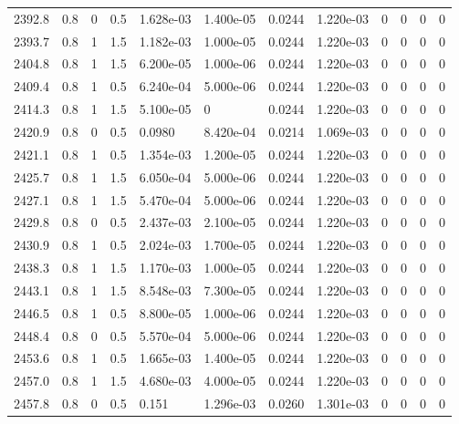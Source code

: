 \documentclass[preview]{standalone}
\begin{document}
{{{{{{{{{{{{{{\begin{tabular}{L{1.2cm}C{1.2cm} C{0.3cm}C{0.5cm} C{1.4cm}C{1.4cm} C{1.4cm}C{1.4cm} C{1.6cm}C{1.6cm} C{1.6cm}C{1.6cm}}
  2392.8  &   0.8  & 0     & 0.5 &  1.628e-03  & 1.400e-05  &  0.0244&   1.220e-03& 0 & 0   &  0 & 0  \\ 
  2393.7  &   0.8  & 1     & 1.5 &  1.182e-03  & 1.000e-05  &  0.0244&   1.220e-03& 0 & 0   &  0 & 0  \\ 
  2404.8  &   0.8  & 1     & 1.5 &  6.200e-05  & 1.000e-06  &  0.0244&   1.220e-03& 0 & 0   &  0 & 0  \\ 
  2409.4  &   0.8  & 1     & 0.5 &  6.240e-04  & 5.000e-06  &  0.0244&   1.220e-03& 0 & 0   &  0 & 0  \\ 
  2414.3  &   0.8  & 1     & 1.5 &  5.100e-05  & 0  &  0.0244&   1.220e-03& 0 & 0   &  0 & 0  \\ 
  2420.9  &   0.8  & 0     & 0.5 &  0.0980  & 8.420e-04  &  0.0214&   1.069e-03& 0 & 0   &  0 & 0  \\ 
  2421.1  &   0.8  & 1     & 0.5 &  1.354e-03  & 1.200e-05  &  0.0244&   1.220e-03& 0 & 0   &  0 & 0  \\ 
  2425.7  &   0.8  & 1     & 1.5 &  6.050e-04  & 5.000e-06  &  0.0244&   1.220e-03& 0 & 0   &  0 & 0  \\ 
  2427.1  &   0.8  & 1     & 1.5 &  5.470e-04  & 5.000e-06  &  0.0244&   1.220e-03& 0 & 0   &  0 & 0  \\ 
  2429.8  &   0.8  & 0     & 0.5 &  2.437e-03  & 2.100e-05  &  0.0244&   1.220e-03& 0 & 0   &  0 & 0  \\ 
  2430.9  &   0.8  & 1     & 0.5 &  2.024e-03  & 1.700e-05  &  0.0244&   1.220e-03& 0 & 0   &  0 & 0  \\ 
  2438.3  &   0.8  & 1     & 1.5 &  1.170e-03  & 1.000e-05  &  0.0244&   1.220e-03& 0 & 0   &  0 & 0  \\ 
  2443.1  &   0.8  & 1     & 1.5 &  8.548e-03  & 7.300e-05  &  0.0244&   1.220e-03& 0 & 0   &  0 & 0  \\ 
  2446.5  &   0.8  & 1     & 0.5 &  8.800e-05  & 1.000e-06  &  0.0244&   1.220e-03& 0 & 0   &  0 & 0  \\ 
  2448.4  &   0.8  & 0     & 0.5 &  5.570e-04  & 5.000e-06  &  0.0244&   1.220e-03& 0 & 0   &  0 & 0  \\ 
  2453.6  &   0.8  & 1     & 0.5 &  1.665e-03  & 1.400e-05  &  0.0244&   1.220e-03& 0 & 0   &  0 & 0  \\ 
  2457.0  &   0.8  & 1     & 1.5 &  4.680e-03  & 4.000e-05  &  0.0244&   1.220e-03& 0 & 0   &  0 & 0  \\ 
  2457.8  &   0.8  & 0     & 0.5 &  0.151  & 1.296e-03  &  0.0260&   1.301e-03& 0 & 0   &  0 & 0  \\ 

\end{tabular}}}}}}}}}}}}}}}
\end{document}
